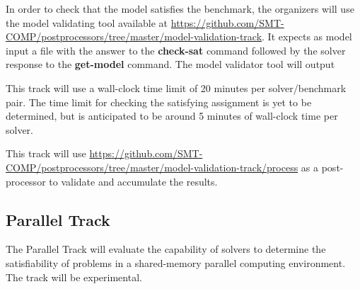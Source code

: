 \documentclass[12pt]{article}
\newcommand{\akey}[1]{\textbf{#1}\xspace}
\newcommand{\paralleltrack}{Parallel Track\xspace}
\begin{document}
In order to check that the model satisfies the benchmark, the organizers will
use the model validating tool available at
{\url{https://github.com/SMT-COMP/postprocessors/tree/master/model-validation-track}}.
It expects as model input a file with the answer to the \akey{check-sat}
command followed by the solver response to the \akey{get-model} command.
The model validator tool will output

This track will use a wall-clock time limit of 20 minutes per solver/benchmark
pair. The time limit for checking the satisfying assignment is yet to be
determined, but is anticipated to be around 5 minutes of wall-clock time per
solver.

This track will use
{\url{https://github.com/SMT-COMP/postprocessors/tree/master/model-validation-track/process}}
as a post-processor
to validate and accumulate the results.


\subsection{\paralleltrack{}}
The \paralleltrack{} will evaluate the capability of solvers to
determine the satisfiability of problems in a shared-memory parallel
computing environment.  The track will be experimental.
\end{document}
